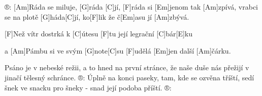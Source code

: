 
®: [Am]Ráda se miluje, [G]ráda [C]jí, 
[F]ráda si [Em]jenom tak [Am]zpívá,
vrabci se na plotě [G]háda[C]jí, 
ko[F]lik že č[Em]asu jí [Am]zbývá.

[F]Než vítr dostrká k [C]\null útesu [F]tu její legrační [C]bár[E]ku

a [Am]Pámbu si ve svým [G]note[C]su [F]udělá [Em]jen další [Am]\null čárku.
\begin{raggedmulticols}{2}
	Psáno je v nebeské režii, a to hned na první stránce,
	že naše duše nás přežijí v jinačí tělesný schránce.
	®:
	\slpc
	Úplně na konci paseky, tam, kde se ozvěna tříští,
	sedí šnek ve snacku pro šneky - snad její podoba příští.
	®:
\end{raggedmulticols}
